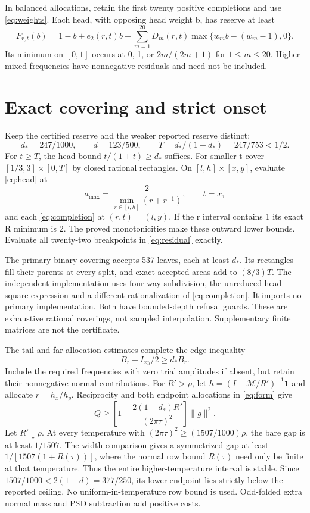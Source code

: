 \documentclass[11pt]{article}
\begin{document}
In balanced allocations, retain the first twenty positive completions and use \eqref{eq:weights}. Each head, with opposing head weight b, has reserve at least
\begin{equation}
 F_{r,t}(b)=1-b+e_2(r,t)b+
 \sum_{m=1}^{20}D_m(r,t)\max\{w_mb-(w_m-1),0\}.\label{eq:residual}
\end{equation}
Its minimum on $[0,1]$ occurs at 0, 1, or $2m/(2m+1)$ for $1\le m\le20$. Higher mixed frequencies have nonnegative residuals and need not be included.

\section{Exact covering and strict onset}
Keep the certified reserve and the weaker reported reserve distinct:
\[
 d_*=247/1000,\qquad d=123/500,\qquad T=d_*/(1-d_*)=247/753<1/2.
\]
For $t\ge T$, the head bound $t/(1+t)\ge d_*$ suffices. For smaller t cover $[1/3,3]\times[0,T]$ by closed rational rectangles. On $[l,h]\times[x,y]$, evaluate \eqref{eq:head} at
\[
 a_{\max}=\frac2{\min_{r\in[l,h]}(r+r^{-1})},\qquad t=x,
\]
and each \eqref{eq:completion} at $(r,t)=(l,y)$. If the r interval contains 1 its exact R minimum is 2. The proved monotonicities make these outward lower bounds. Evaluate all twenty-two breakpoints in \eqref{eq:residual} exactly.

The primary binary covering accepts 537 leaves, each at least $d_*$. Its rectangles fill their parents at every split, and exact accepted areas add to $(8/3)T$. The independent implementation uses four-way subdivision, the unreduced head square expression and a different rationalization of \eqref{eq:completion}. It imports no primary implementation. Both have bounded-depth refusal guards. These are exhaustive rational coverings, not sampled interpolation. Supplementary finite matrices are not the certificate.

The tail and far-allocation estimates complete the edge inequality
\[
 B_r+I_{xy}/2\ge d_*B_r.
\]
Include the required frequencies with zero trial amplitudes if absent, but retain their nonnegative normal contributions. For $R'>\rho$, let $h=(I-\mathcal M/R')^{-1}\mathbf1$ and allocate $r=h_x/h_y$. Reciprocity and both endpoint allocations in \eqref{eq:form} give
\[
 Q\ge\left[1-\frac{2(1-d_*)R'}{(2\pi\tau)^2}\right]\|g\|^2.
\]
Let $R'\downarrow\rho$. At every temperature with $(2\pi\tau)^2\ge(1507/1000)\rho$, the bare gap is at least $1/1507$. The width comparison gives a symmetrized gap at least $1/[1507(1+R(\tau))]$, where the normal row bound $R(\tau)$ need only be finite at that temperature. Thus the entire higher-temperature interval is stable. Since $1507/1000<2(1-d)=377/250$, its lower endpoint lies strictly below the reported ceiling. No uniform-in-temperature row bound is used. Odd-folded extra normal mass and PSD subtraction add positive costs.
\end{document}
